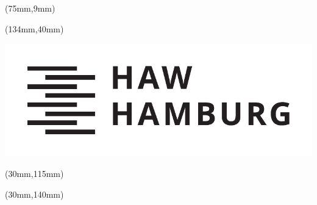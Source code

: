 %
%

\thispagestyle{empty}
\begin{titlepage}
{\selectfont

  \hfuzz=20pt
\begin{textblock*}{\textwidth}(75mm,9mm)
  \begin{minipage}[b][0cm][b]{\textwidth}
  \hfuzz=20pt
  \fontsize{16pt}{16pt}
  \selectfont
    \begin{flushleft}
    	  \IthesisNDAFull
    \end{flushleft}
  \end{minipage}
\end{textblock*}

\begin{textblock*}{\textwidth}(134mm,40mm)
  \begin{minipage}[b][0cm][b]{\textwidth}
    \includegraphics[scale=0.5]{style/HAW_Marke_schwarz}
  \end{minipage}
\end{textblock*}

\begin{textblock*}{\textwidth}(30mm,115mm)
  \begin{minipage}[b][0cm][b]{\textwidth}
    \fontsize{22pt}{20pt}
    \selectfont
  	\begin{flushright}
      \IthesisKind
  	\end{flushright}
  \end{minipage}
\end{textblock*}

\begin{textblock*}{\textwidth}(30mm,140mm)
  \begin{minipage}[b][0cm][b]{\textwidth}
  \fontsize{14pt}{20pt}
  \selectfont
    \begin{flushright}
      \IthesisAuthor
  	\end{flushright}
  \end{minipage}
\end{textblock*}

}
\end{titlepage}
